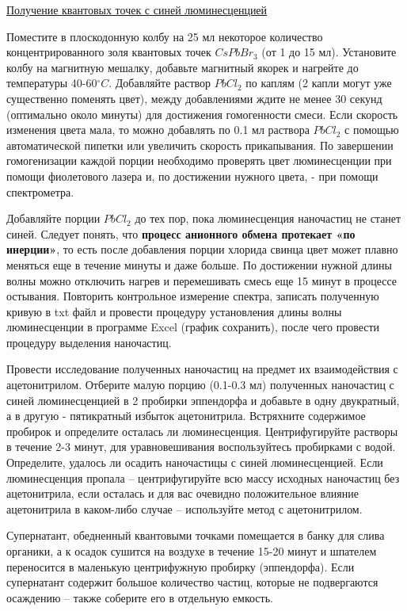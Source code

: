 \underline{Получение квантовых точек с синей люминесценцией}

Поместите в плоскодонную колбу на 25 мл некоторое количество концентрированного золя квантовых точек $CsPbBr_3$ (от 1 до 15 мл). Установите колбу на магнитную мешалку, добавьте магнитный якорек и нагрейте до температуры 40-60$^\circ C$. Добавляйте раствор $PbCl_2$ по каплям (2 капли могут уже существенно поменять цвет), между добавлениями ждите не менее 30 секунд (оптимально около минуты) для достижения гомогенности смеси. Если скорость изменения цвета мала, то можно добавлять по 0.1 мл раствора $PbCl_2$ с помощью автоматической пипетки или увеличить скорость прикапывания. По завершении гомогенизации каждой порции необходимо проверять цвет люминесценции при помощи фиолетового лазера и, по достижении нужного цвета, - при помощи спектрометра.

Добавляйте порции $PbCl_2$ до тех пор, пока люминесценция наночастиц не станет синей. Следует понять, что \textbf{процесс анионного обмена протекает «по инерции»}, то есть после добавления порции хлорида свинца цвет может плавно меняться еще в течение минуты и даже больше. По достижении нужной длины волны можно отключить нагрев и перемешивать смесь еще 15 минут в процессе остывания. Повторить контрольное измерение спектра, записать полученную кривую в txt файл и провести процедуру установления длины волны люминесценции в программе Excel (график сохранить), после чего провести процедуру выделения наночастиц.

Провести исследование полученных наночастиц на предмет их взаимодействия с ацетонитрилом. Отберите малую порцию (0.1-0.3 мл) полученных наночастиц с синей люминесценцией в 2 пробирки эппендорфа и добавьте в одну двукратный, а в другую - пятикратный избыток ацетонитрила. Встряхните содержимое пробирок и определите осталась ли люминесценция. Центрифугируйте растворы в течение 2-3 минут, для уравновешивания воспользуйтесь пробирками с водой. Определите, удалось ли осадить наночастицы с синей люминесценцией. Если люминесценция пропала – центрифугируйте всю массу исходных наночастиц без ацетонитрила, если осталась и для вас очевидно положительное влияние ацетонитрила в каком-либо случае – используйте метод с ацетонитрилом.

Супернатант, обедненный квантовыми точками помещается в банку для слива органики, а к осадок сушится на воздухе в течение 15-20 минут и шпателем переносится в маленькую центрифужную пробирку (эппендорфа). Если супернатант содержит большое количество частиц, которые не подвергаются осаждению – также соберите его в отдельную емкость.

